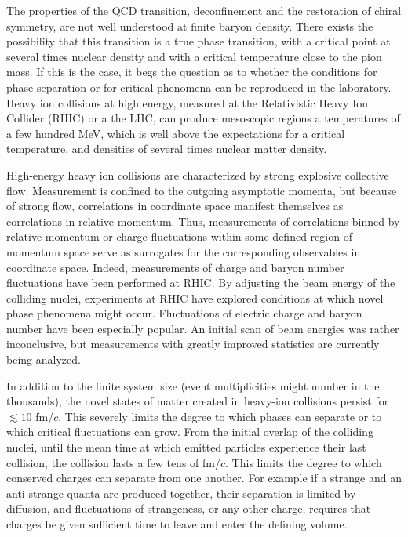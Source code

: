 \documentclass[aps,prc,nofootinbib,showpacs,superscriptaddress,groupedaddress]{revtex4-1}
\begin{document}
The properties of the QCD  transition, deconfinement and the restoration of chiral symmetry, are not well understood at finite baryon density. There exists the possibility that this transition is a true phase transition, with a critical point at several times nuclear density and with a critical temperature close to the pion mass. If this is the case, it begs the question as to whether the conditions for phase separation or for critical phenomena can be reproduced in the laboratory. Heavy ion collisions at high energy, measured at the Relativistic Heavy Ion Collider (RHIC) or a the LHC, can produce mesoscopic regions a temperatures of a few hundred MeV, which is well above the expectations for a critical temperature, and densities of several times nuclear matter density. 

High-energy heavy ion collisions are characterized by strong explosive collective flow. Measurement is confined to the outgoing asymptotic momenta, but because of strong flow, correlations in coordinate space manifest themselves as correlations in relative momentum. Thus, measurements of correlations binned by relative momentum or charge fluctuations within some defined region of momentum space serve as surrogates for the corresponding observables in coordinate space. Indeed, measurements of charge and baryon number fluctuations have been performed at RHIC. By adjusting the beam energy of the colliding nuclei, experiments at RHIC have explored conditions at which novel phase phenomena might occur. Fluctuations of electric charge and baryon number have been especially popular. An initial scan of beam energies was rather inconclusive, but measurements with greatly improved statistics are currently being analyzed. 

In addition to the finite system size (event multiplicities might number in the thousands), the novel states of matter created in heavy-ion collisions persist for $\lesssim 10$ fm/$c$. This severely limits the degree to which phases can separate or to which critical fluctuations can grow. From the initial overlap of the colliding nuclei, until the mean time at which emitted particles experience their last collision, the collision lasts a few tens of fm/$c$. This limits the degree to which conserved charges can separate from one another. For example if a strange and an anti-strange quanta are produced together, their separation is limited by diffusion, and fluctuations of strangeness, or any other charge, requires that charges be given sufficient time to leave and enter the defining volume.
\end{document}
